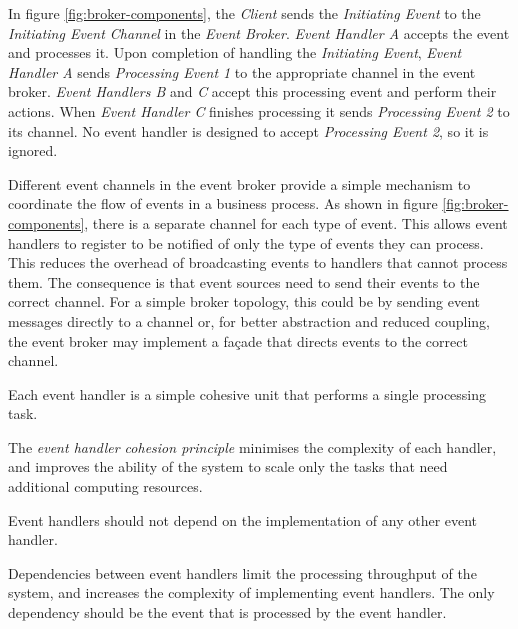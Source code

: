 In figure \ref{fig:broker-components}, the \emph{Client} sends the \emph{Initiating Event} to the \emph{Initiating Event Channel} in the \emph{Event Broker}.
\emph{Event Handler A} accepts the event and processes it.
Upon completion of handling the \emph{Initiating Event},
\emph{Event Handler A} sends \emph{Processing Event 1} to the appropriate channel in the event broker.
\emph{Event Handlers B} and \emph{C} accept this processing event and perform their actions.
When \emph{Event Handler C} finishes processing it sends \emph{Processing Event 2} to its channel.
No event handler is designed to accept \emph{Processing Event 2}, so it is ignored.

Different event channels in the event broker provide a simple mechanism to coordinate the flow of events in a business process.
As shown in figure \ref{fig:broker-components}, there is a separate channel for each type of event.
This allows event handlers to register to be notified of only the type of events they can process.
This reduces the overhead of broadcasting events to handlers that cannot process them.
The consequence is that event sources need to send their events to the correct channel.
For a simple broker topology, this could be by sending event messages directly to a channel
or, for better abstraction and reduced coupling, the event broker may implement a façade that directs events to the correct channel.

\vspace{1mm}
\begin{definition}\label{def:cohesion}
    Each event handler is a simple cohesive unit that performs a single processing task.
\end{definition}

The \emph{event handler cohesion principle} minimises the complexity of each handler,
and improves the ability of the system to scale only the tasks that need additional computing resources.

\vspace{1mm}
\begin{definition}\label{def:independence}
    Event handlers should not depend on the implementation of any other event handler.
\end{definition}

Dependencies between event handlers limit the processing throughput of the system,
and increases the complexity of implementing event handlers.
The only dependency should be the event that is processed by the event handler.


